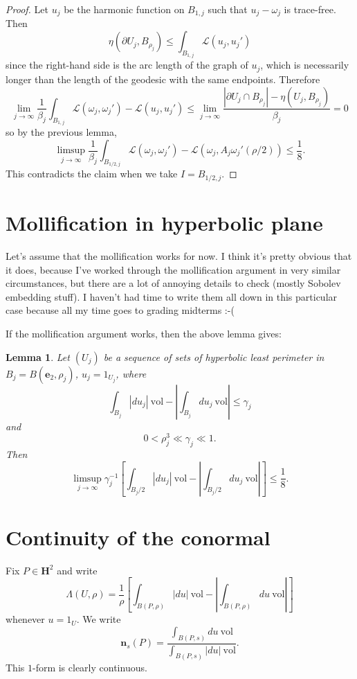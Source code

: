 \documentclass[reqno,12pt,letterpaper]{amsart}
\newcommand{\Hyp}{\mathbf H}
\newcommand{\evect}{\mathbf e}
\newcommand{\normal}{\mathbf n}
\newcommand{\vol}{\mathrm{vol}}
\newtheorem{lemma}[theorem]{Lemma}
\theoremstyle{definition}
\numberwithin{equation}{section}
\begin{document}
\begin{proof}
Let $u_j$ be the harmonic function on $B_{1, j}$ such that $u_j - \omega_j$ is trace-free. Then
$$\eta(\partial U_j, B_{\rho_j}) \leq \int_{B_{1, j}} \mathscr L(u_j, u_j')$$
since the right-hand side is the arc length of the graph of $u_j$, which is necessarily longer than the length of the geodesic with the same endpoints.
Therefore
$$\lim_{j \to \infty} \frac{1}{\beta_j} \int_{B_{1, j}} \mathscr L(\omega_j, \omega_j') - \mathscr L(u_j, u_j') \leq \lim_{j \to \infty} \frac{|\partial U_j \cap B_{\rho_j}| - \eta(U_j, B_{\rho_j})}{\beta_j} = 0$$
so by the previous lemma,
$$\limsup_{j \to \infty} \frac{1}{\beta_j} \int_{B_{1/2,j}} \mathscr L(\omega_j, \omega_j') - \mathscr L(\omega_j, A_j \omega_j'(\rho/2)) \leq \frac{1}{8}.$$
This contradicts the claim when we take $I = B_{1/2,j}$.
\end{proof}

\section{Mollification in hyperbolic plane}
Let's assume that the mollification works for now.
I think it's pretty obvious that it does, because I've worked through the mollification argument in very similar circumstances, but there are a lot of annoying details to check (mostly Sobolev embedding stuff).
I haven't had time to write them all down in this particular case because all my time goes to grading midterms :-(

If the mollification argument works, then the above lemma gives:
\begin{lemma}
Let $(U_j)$ be a sequence of sets of hyperbolic least perimeter in $B_j = B(\evect_2, \rho_j)$, $u_j = 1_{U_j}$, where
$$\int_{B_j} |du_j| ~\vol - \left|\int_{B_j} du_j ~\vol\right| \leq \gamma_j$$
and
$$0 < \rho_j^3 \ll \gamma_j \ll 1.$$
Then
$$\limsup_{j \to \infty} \gamma_j^{-1}\left[\int_{B_j/2} |du_j| ~\vol - \left|\int_{B_j/2} du_j ~\vol\right|\right] \leq \frac{1}{8}.$$
\end{lemma}

\section{Continuity of the conormal}
Fix $P \in \Hyp^2$ and write
$$\Lambda(U, \rho) = \frac{1}{\rho}\left[\int_{B(P, \rho)} |du| ~\vol - \left|\int_{B(P, \rho)} du ~\vol\right|\right]$$
whenever $u = 1_U$.
We write
$$\normal_s(P) = \frac{\int_{B(P, s)} du ~\vol}{\int_{B(P, s)} |du| ~\vol}.$$
This $1$-form is clearly continuous.
\end{document}
